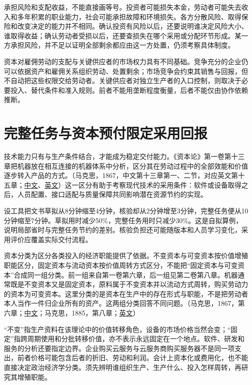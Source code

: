 \documentclass[UTF8,fontset=windows,12pt,a4paper,oneside,openany]{ctexbook}
\begin{document}
承担风险和支配收益，不能直接画等号。投资者可能损失本金，劳动者可能失去收入和多年积累的职业能力，社会可能承担故障和环境损失。各方分散风险、取得保险和改变决定的能力并不相同。确认投资有风险以后，还要说明谁决定风险大小、谁取得收益；确认劳动者受损以后，还要查损失在哪个采用或分配环节形成。某一方承担风险，并不足以证明全部剩余都应由这一方处置，仍须考察具体制度。

资本对雇佣劳动的支配与关键供应者的市场权力具有不同基础。竞争充分的企业仍可以依据资产和雇佣关系组织劳动、处置剩余；市场竞争会约束其销售与回报，但不自动把这些权限交给劳动者。关键供应者对独立生产者的入口控制，则取决于必要投入、替代条件和准入规则。前者不能用垄断程度衡量，后者不能仅由协作依赖推断。

\section{完整任务与资本预付限定采用回报}

技术能力只有与生产条件结合，才能成为稳定交付能力。《资本论》第一卷第十三章把机器放在相互连接的机器体系中分析，区分其在劳动过程中的全部效能和价值逐步转入产品的方式。（马克思，1867，中文第十三章第一、二节，对应英文第十五章；\href{https://www.marxists.org/chinese/marx-engels/23/023.htm}{中文}、\href{https://www.marxists.org/archive/marx/works/1867-c1/ch15.htm}{英文}）这一区分有助于考察现代技术的采用条件：软件或设备取得之后，人员配置、接口适配与质量保障共同影响潜在资源节约的实现。

设工具把文书草拟从8分钟缩至4分钟，核验却从2分钟增至3分钟，完整任务便从10分钟缩至7分钟。草拟用时减少50\%，完整任务用时只减少30\%。这是自拟算例，说明局部省时与完整任务节约的差别。核验负担还可能随版本和人员学习变化，采用评价应覆盖实际交付流程。

资本分类为区分各类投入的经济职能提供了依据。不变资本与可变资本按价值增殖职能区分，固定资本与流动资本按价值周转方式区分，不能把“固定资本与可变资本”合成同一组分类。前一组来自第一卷第六章，后一组见第二卷第八章。机器通常既是不变资本又是固定资本，原料属于不变资本并以流动方式周转，购买劳动力的资本为可变资本。这里分类的是资本在生产中的存在形式与职能，不是把劳动者本人当作一件归企业所有的资产。这两组分类回答不同问题。（马克思，1867，第六章；\href{https://www.marxists.org/chinese/marx-engels/23/016.htm}{中文}；马克思，1885，第八章；\href{https://www.marxists.org/archive/marx/works/1885-c2/ch08.htm}{英文}）

“不变”指生产资料在该理论中的价值转移角色，设备的市场价格当然会变；“固定”指跨周期使用和分批转移价值，亦不表示永远固定在一个地点。软件、研发和服务的分析还要指定边界。企业购买云服务与云服务商购买服务器不是同一项支出，前者价格可能包含后者的折旧、劳动和利润。会计上资本化或费用化，也不能直接决定政治经济学分类。须先辨明谁组织生产、生产什么、投入怎样周转，再研究其增殖职能。
\end{document}

